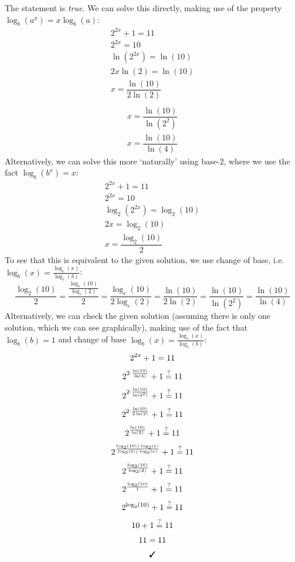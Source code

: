 \documentclass[11pt,letterpaper]{article}
\newcommand{\cmark}{\ding{51}}	%
\begin{document}
\sol The statement is \textit{true}. We can solve this directly, making use of the property $\log_b(a^x)= x \log_b(a)$:
	\[
	\begin{gathered}
	2^{2x} + 1= 11 \\[0.1cm]
	2^{2x}= 10 \\[0.1cm]
	\ln(2^{2x})= \ln(10) \\[0.1cm]
	2x \ln(2)= \ln(10) \\[0.1cm]
	x= \dfrac{\ln(10)}{2 \ln(2)} \\[0.1cm]
	\end{gathered}
	\]
	\[
	\begin{gathered}
	x= \dfrac{\ln(10)}{\ln(2^2)} \\[0.1cm]
	x= \dfrac{\ln(10)}{\ln(4)}
	\end{gathered}
	\]
Alternatively, we can solve this more `naturally' using base-$2$, where we use the fact $\log_b(b^x)= x$: 
	\[
	\begin{gathered}
	2^{2x} + 1= 11 \\[0.1cm]
	2^{2x}= 10 \\[0.1cm]
	\log_2(2^{2x})= \log_2(10) \\[0.1cm]
	2x= \log_2(10) \\[0.1cm]
	x= \dfrac{\log_2(10)}{2}
	\end{gathered}
	\]
To see that this is equivalent to the given solution, we use change of base, i.e. $\log_b(x)= \frac{\log_c(x)}{\log_c(b)}$:
	\[
	\dfrac{\log_2(10)}{2}= \dfrac{\frac{\log_e(10)}{\log_e(2)}}{2}= \dfrac{\log_e(10)}{2 \log_e(2)}= \dfrac{\ln(10)}{2 \ln(2)}= \dfrac{\ln(10)}{\ln(2^2)}= \dfrac{\ln(10)}{\ln(4)}
	\]
Alternatively, we can check the given solution (assuming there is only one solution, which we can see graphically), making use of the fact that $\log_b(b)= 1$ and change of base $\log_b(x)= \frac{\log_c(x)}{\log_c(b)}$: 
	\[
	\begin{gathered}
	2^{2x} + 1= 11 \\[0.1cm]
	2^{2 \cdot \frac{\ln(10)}{\ln(4)}} + 1 \stackrel{?}{=} 11 \\[0.1cm]
	2^{2 \cdot \frac{\ln(10)}{\ln(2^2)}} + 1 \stackrel{?}{=} 11 \\[0.1cm]
	2^{2 \cdot \frac{\ln(10)}{2 \ln(2)}} + 1 \stackrel{?}{=} 11 \\[0.1cm]
	2^{\frac{\ln(10)}{\ln(2)}} + 1 \stackrel{?}{=} 11 \\[0.1cm]
	2^{\frac{\log_2(10)/\log_2(e)}{\log_2(2)/\log_2(e)}} + 1 \stackrel{?}{=} 11 \\[0.1cm]
	2^{\frac{\log_2(10)}{\log_2(2)}} + 1 \stackrel{?}{=} 11 \\[0.1cm]
	2^{\frac{\log_2(10)}{1}} + 1 \stackrel{?}{=} 11 \\[0.1cm]
	2^{\log_2(10)} + 1 \stackrel{?}{=} 11 \\[0.1cm]
	10 + 1 \stackrel{?}{=} 11 \\[0.1cm]
	11= 11 \\[0.1cm]
	\text{\cmark}
	\end{gathered}
	\]
\end{document}
